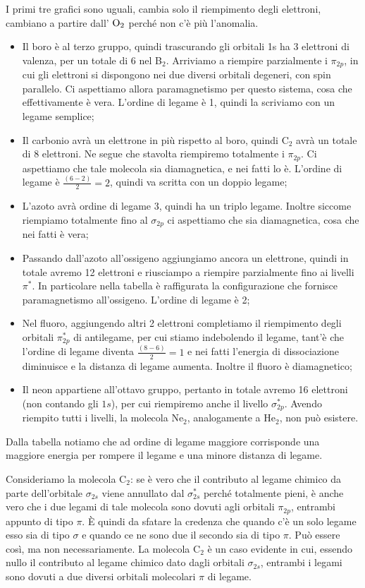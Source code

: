 I primi tre grafici sono uguali, cambia solo il riempimento degli elettroni, cambiano a partire dall' $\rm O_2$ perché non c'è più l'anomalia.
\begin{itemize}
    \item Il boro è al terzo gruppo, quindi trascurando gli orbitali 1s ha 3 elettroni di valenza, per un totale di 6 nel B$_2$.
    Arriviamo a riempire parzialmente i $\pi_{2p}$, in cui gli elettroni si dispongono nei due diversi orbitali degeneri, con spin parallelo. Ci aspettiamo allora paramagnetismo per questo sistema, cosa che effettivamente è vera. L'ordine di legame è 1, quindi la scriviamo con un legame semplice;
    \item Il carbonio avrà un elettrone in più rispetto al boro, quindi C$_2$ avrà un totale di 8 elettroni. Ne segue che stavolta riempiremo totalmente i $\pi_{2p}$. Ci aspettiamo che tale molecola sia diamagnetica, e nei fatti lo è. L'ordine di legame è $\frac{(6-2)}{2}=2$, quindi va scritta con un doppio legame;
    \item L'azoto avrà ordine di legame 3, quindi ha un triplo legame. Inoltre siccome riempiamo totalmente fino al $\sigma_{2p}$ ci aspettiamo che sia diamagnetica, cosa che nei fatti è vera;
    \item Passando dall'azoto all'ossigeno aggiungiamo ancora un elettrone, quindi in totale avremo 12 elettroni e riusciampo a riempire parzialmente fino ai livelli $\pi^*$. In particolare nella tabella è raffigurata la configurazione che fornisce paramagnetismo all'ossigeno. L'ordine di legame è 2;
    \item Nel fluoro, aggiungendo altri 2 elettroni completiamo il riempimento degli orbitali $\pi_{2p}^*$ di antilegame, per cui stiamo indebolendo il legame, tant'è che l'ordine di legame diventa $\frac{(8-6)}{2}=1$ e nei fatti l'energia di dissociazione diminuisce e la distanza di legame aumenta. Inoltre il fluoro è diamagnetico;
    \item Il neon appartiene all'ottavo gruppo, pertanto in totale avremo 16 elettroni (non contando gli $1s$), per cui riempiremo anche il livello $\sigma_{2p}^*$. Avendo riempito tutti i livelli, la molecola Ne$_2$, analogamente a He$_2$, non può esistere.
\end{itemize}
Dalla tabella notiamo che ad ordine di legame maggiore corrisponde una maggiore energia per rompere il legame e una minore distanza di legame.

Consideriamo la molecola C$_2$: se è vero che il contributo al legame chimico da parte dell'orbitale $\sigma_{2s}$ viene annullato dal $\sigma_{2s}^*$ perché totalmente pieni, è anche vero che i due legami di tale molecola sono dovuti agli orbitali $\pi_{2p}$, entrambi appunto di tipo $\pi$. È quindi da sfatare la credenza che quando c'è un solo legame esso sia di tipo $\sigma$ e quando ce ne sono due il secondo sia di tipo $\pi$. Può essere così, ma non necessariamente. La molecola C$_2$ è un caso evidente in cui, essendo nullo il contributo al legame chimico dato dagli orbitali $\sigma_{2s}$, entrambi i legami sono dovuti a due diversi orbitali molecolari $\pi$ di legame.

